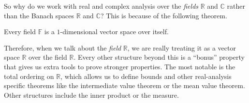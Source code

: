 \documentclass{article}
\begin{document}
  So why do we work with real and complex analysis over the \textit{fields} $\mathbb{R}$ and $\mathbb{C}$ rather than the Banach spaces $\mathbb{R}$ and $\mathbb{C}$? This is because of the following theorem. 

  \begin{theorem}
    Every field $\mathbb{F}$ is a $1$-dimensional vector space over itself. 
  \end{theorem}

  Therefore, when we talk about the \textit{field} $\mathbb{R}$, we are really treating it as a vector space $\mathbb{R}$ over the field $\mathbb{R}$. Every other structure beyond this is a ``bonus'' property that gives us extra tools to prove stronger properties. The most notable is the total ordering on $\mathbb{R}$, which allows us to define bounds and other real-analysis specific theorems like the intermediate value theorem or the mean value theorem. Other structures include the inner product or the measure. 
\end{document}

